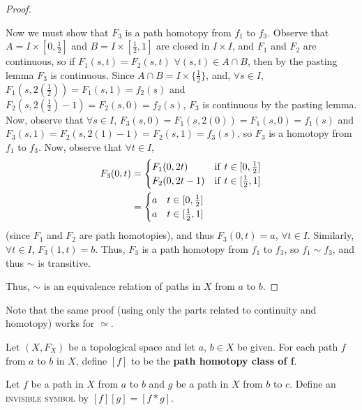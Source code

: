 \begin{proof}
\begin{itemize}
Now we must show that $F_3$ is a path homotopy from $f_1$ to $f_3$. Observe that $A = I \times [0, \frac{1}{2}]$ and $B= I \times [\frac{1}{2}, 1]$ are closed in $I \times I$, and $F_1$ and $F_2$ are continuous, so if $F_1(s,t) = F_2(s,t)$ $\forall (s,t) \in A \cap B$, then by the pasting lemma $F_3$ is continuous. Since $A \cap B = I \times \{\frac{1}{2}\}$, and, $\forall s \in I$, $F_1(s, 2(\frac{1}{2})) = F_1(s, 1) = f_2(s)$ and $F_2(s, 2(\frac{1}{2}) - 1) = F_2(s, 0) = f_2(s)$, $F_3$ is continuous by the pasting lemma. Now, observe that $\forall s \in I$, $F_3(s, 0) = F_1(s, 2(0)) = F_1(s, 0) = f_1(s)$ and $F_3(s, 1) = F_2(s, 2(1) - 1) = F_2(s, 1) = f_3(s)$, so $F_3$ is a homotopy from $f_1$ to $f_3$. Now, observe that $\forall t \in I$, 
\begin{align*}
   F_3(0,t) &= \begin{cases}
       F_1(0,2t) & \mathrm{if }$ $ t \in [0, \frac{1}{2}]\\
       F_2(0,2t - 1) & \mathrm{if }$ $ t \in [\frac{1}{2}, 1]
     \end{cases}\\
    &= \begin{cases}
       a &  t \in [0, \frac{1}{2}]\\
       a &  t \in [\frac{1}{2}, 1]
     \end{cases}
\end{align*} 
(since $F_1$ and $F_2$ are path homotopies), and thus $F_3(0,t) = a$, $\forall t \in I$. Similarly, $\forall t \in I$, $F_3(1,t) = b$. Thus, $F_3$ is a path homotopy from $f_1$ to $f_3$, so $f_1 \sim f_3$, and thus $\sim$ is transitive.
\end{itemize}
Thus, $\sim$ is an equivalence relation of paths in $X$ from $a$ to $b$.
\end{proof}

Note that the same proof (using only the parts related to continuity and homotopy) works for $\simeq$.


\begin{definition}
 Let $(X, F_X)$ be a topological space and let $a$, $b \in X$ be given. For each path $f$ from $a$ to $b$ in $X$, define $[f]$ to be the \textbf{path homotopy class of f}.
 \end{definition}
\begin{definition} Let $f$ be a path in $X$ from $a$ to $b$ and $g$ be a path in $X$ from $b$ to $c$. Define an \textsc{invisible symbol} by $[f][g] = [f \ast g]$.
\end{definition}

